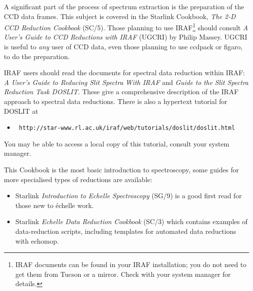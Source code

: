 \documentclass[twoside,11pt]{article}
\newcommand{\htmladdnormallink}[2]{#1}
\newcommand{\htmlref}[2]{#1}
\newcommand{\xref}[3]{#1}
\newcommand{\scspec}[2]{#1}
\newcommand{\scspec}[2]{#2}
\begin{document}
A significant part of the process of spectrum extraction
is the preparation of the \htmlref{CCD}{gl_ccd} data frames.
This subject is covered in the Starlink Cookbook,
\xref{{\sl The 2-D CCD Reduction Cookbook} (SC/5)}{sc5}{}.
Those planning to use
\htmladdnormallink{IRAF}
{http://star-www.rl.ac.uk/iraf/web/iraf-homepage.html}\scspec{\footnote{IRAF
documents can be found in your IRAF installation; you
do not need to get them from Tucson or a mirror.  Check with your
system manager for
details.}}{{\bf (All IRAF-related hyperlinks in this document are to the
UK-based Starlink IRAF mirror except \htmladdnormallink{this one}
{http://iraf.noao.edu/} which goes to the Tucson site.)}} should consult
\htmladdnormallink{{\sl A User's Guide to CCD Reductions with IRAF}}
{ftp://starlink-ftp.rl.ac.uk/pub/iraf/iraf/docs/ccduser2.ps.Z} (UGCRI) by
Philip Massey.
UGCRI is useful to {\em any} user of CCD data, even those
planning to use \xref{{\sc ccdpack}}{sun139}{}\cite{ccdpack} or
\xref{{\sc figaro}}{sun86}{}\cite{figaro}, to do the preparation.

IRAF users should read the documents for spectral data reduction
within IRAF:
\htmladdnormallink{{\sl A User's Guide to Reducing Slit Spectra With IRAF}}
{ftp://starlink-ftp.rl.ac.uk/pub/iraf/iraf/docs/spect.ps.Z}
and
\htmladdnormallink{{\sl Guide to the Slit Spectra Reduction Task DOSLIT\@.}}
{ftp://starlink-ftp.rl.ac.uk/pub/iraf/iraf/docs/doslit.ps.Z}
These give a comprehensive description of the IRAF approach to spectral
data reductions.  There is also a hypertext tutorial for DOSLIT at

\begin{itemize}

\item \htmladdnormallink{{\tt
      http://star-www.rl.ac.uk/iraf/web/tutorials/doslit/doslit.html}}
      {http://star-www.rl.ac.uk/iraf/web/tutorials/doslit/doslit.html}

\end{itemize}

You may be able to access a local copy of this tutorial, consult your
system manager.

This Cookbook is the most basic introduction to spectroscopy, some
guides for more specialised types of reductions are available:

\begin{itemize}

\item Starlink \xref{{\sl Introduction to Echelle Spectroscopy}
(SG/9)}{sg9}{} is a good first read for those new to
\'{e}chelle work.

\item Starlink \xref{{\sl Echelle Data Reduction Cookbook}
(SC/3)}{sc3}{} which contains examples of
data-reduction scripts, including templates for automated data
reductions with \xref{{\sc echomop}}{sun152}{}\cite{echomop}\@.

\end{itemize}
\end{document}
